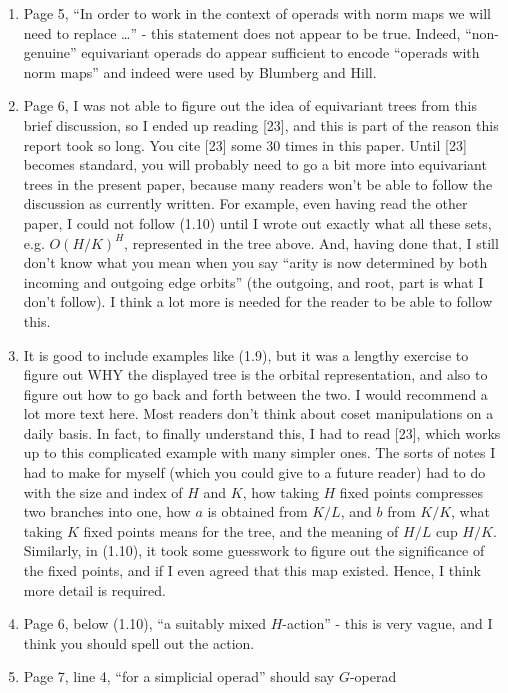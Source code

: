 \documentclass{article}
\begin{document}
\begin{enumerate}
\item
Page 5, ``In order to work in the context of operads with norm maps we will
need to replace \dots'' - this statement does not appear to be true. Indeed, ``non-genuine'' equivariant operads do appear sufficient to encode ``operads with norm maps'' and indeed were used by Blumberg and Hill. 

\item
Page 6, I was not able to figure out the idea of equivariant trees from this brief discussion, so I ended up reading [23], and this is part of the reason this report took so long. You cite [23] some 30 times in this paper. Until [23] becomes standard, you will probably need to go a bit more into equivariant trees in the present paper, because many readers won't be able to follow the discussion as currently written. For example, even having read the other paper, I could not follow (1.10) until I wrote out exactly what all these sets, e.g. $O(H/K)^H$, represented in the tree above. And, having done that, I still don't know what you mean when you say ``arity is now determined by both incoming and outgoing edge orbits'' (the outgoing, and root, part is what I don't follow). I think a lot more is needed for the reader to be able to follow this.

\item 
It is good to include examples like (1.9), but it was a lengthy exercise to figure out WHY the displayed tree is the orbital representation, and also to figure out how to go back and forth between the two. I would recommend a lot more text here. Most readers don't think about coset manipulations on a daily basis. In fact, to finally understand this, I had to read [23], which works up to this complicated example with many simpler ones. The sorts of notes I had to make for myself (which you could give to a future reader) had to do with the size and index of $H$ and $K$, how taking $H$ fixed points compresses two branches into one, how $a$ is obtained from $K/L$, and $b$ from $K/K$, what taking $K$ fixed points means for the tree, and the meaning of $H/L$ cup $H/K$. Similarly, in (1.10), it took some guesswork to figure out the significance of the fixed points, and if I even agreed that this map existed. Hence, I think more detail is required.

\item
Page 6, below (1.10), ``a suitably mixed $H$-action'' - this is very vague, and I think you should spell out the action.


\item
Page 7, line 4, ``for a simplicial operad'' should say $G$-operad


\end{enumerate}
\end{document}
